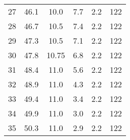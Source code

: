 \begin{table}
{\begin{tabular}{c c c c c c}
    27	& 46.1&	10.0	&7.7	&2.2	&122\\
    28	& 46.7&	10.5	&7.4	&2.2	&122\\
    29	& 47.3&	10.5	&7.1	&2.2	&122\\
    30	& 47.8&	10.75	&6.8	&2.2	&122\\
    31	& 48.4&	11.0	&5.6	&2.2	&122\\
    32	& 48.9&	11.0	&4.3	&2.2	&122\\
    33	& 49.4&	11.0	&3.4	&2.2	&122\\
    34	& 49.9&	11.0	&3.0	&2.2	&122\\
    35	& 50.3&	11.0	&2.9	&2.2	&122\\
    \bottomrule
\end{tabular}
}
\end{table}
